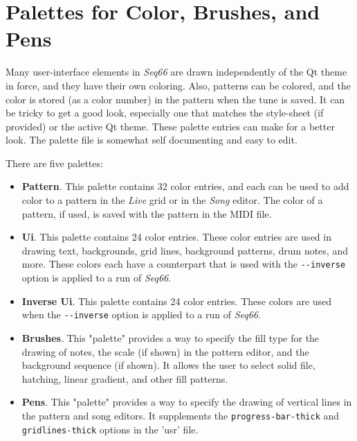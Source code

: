 %
%
%

\section{Palettes for Color, Brushes, and Pens}
\label{sec:palettes}

   Many user-interface elements in \textsl{Seq66} are drawn independently of
   the Qt theme in force, and they have their own coloring.  Also, patterns can
   be colored, and the color is stored (as a color number) in the pattern when
   the tune is saved.
   It can be tricky to get a good look, especially one that matches the
   style-sheet (if provided) or the active Qt theme.
   These palette entries can make for a better look.
   The palette file is somewhat self documenting and easy to edit.

   There are five palettes:

   \begin{itemize}
      \item \textbf{Pattern}.  This palette contains 32 color entries, and each
         can be used to add color to a pattern in the \textsl{Live} grid or in
         the \textsl{Song} editor.  The color of a pattern, if used, is saved
         with the pattern in the MIDI file.
      \item \textbf{Ui}.  This palette contains 24 color entries.  These
         color entries are used in drawing text, backgrounds, grid lines,
         background patterns, drum notes, and more.  These colors each have a
         counterpart that is used with the \texttt{-{}-inverse} option is
         applied to a run of \textsl{Seq66}.
      \item \textbf{Inverse Ui}.  This palette contains 24 color entries.
         These colors are used when the \texttt{-{}-inverse} option is applied
         to a run of \textsl{Seq66}.
      \item \textbf{Brushes}.  This "palette" provides a way to specify the
         fill type for the drawing of notes, the scale (if shown) in the
         pattern editor, and the background sequence (if shown).  It allows the
         user to select solid file, hatching, linear gradient, and other
         fill patterns.
      \item \textbf{Pens}.  This "palette" provides a way to specify the
         drawing of vertical lines in the pattern and song editors.
         It supplements the 
         \texttt{progress-bar-thick} and
         \texttt{gridlines-thick} options in the 'usr' file.
   \end{itemize}


